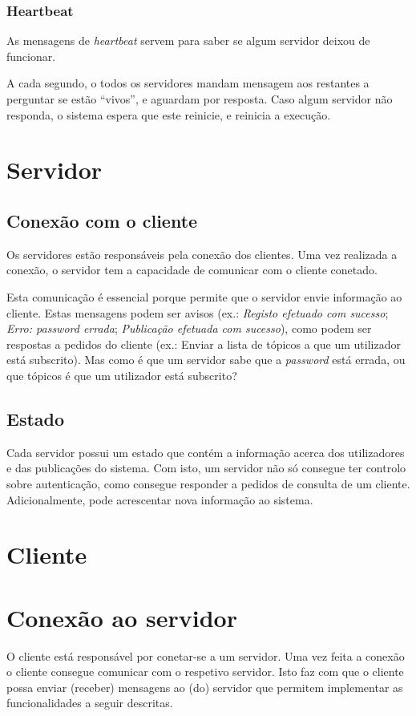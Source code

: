 \documentclass[12pt, a4paper]{report}
\begin{document}
\subsubsection{Heartbeat}
As mensagens de \textit{heartbeat} servem para saber se algum servidor deixou de funcionar.

A cada segundo, o todos os servidores mandam mensagem aos restantes a perguntar se estão ``vivos'', e aguardam por resposta.
Caso algum servidor não responda, o sistema espera que este reinicie, e reinicia a execução.

\section{Servidor}
\subsection{Conexão com o cliente}
Os servidores estão responsáveis pela conexão dos clientes. Uma vez realizada a conexão, o servidor tem a capacidade de comunicar com o cliente conetado.

Esta comunicação é essencial porque permite que o servidor envie informação ao cliente.
Estas mensagens podem ser avisos (ex.: \textit{Registo efetuado com sucesso}; \textit{Erro: password errada}; \textit{Publicação efetuada com sucesso}), como podem ser respostas a pedidos do cliente (ex.: Enviar a lista de tópicos a que um utilizador está subscrito).
Mas como é que um servidor sabe que a \textit{password} está errada, ou que tópicos é que um utilizador está subscrito? 

\subsection{Estado}
Cada servidor possui um estado que contém a informação acerca dos utilizadores e das publicações do sistema.
Com isto, um servidor não só consegue ter controlo sobre autenticação, como consegue responder a pedidos de consulta de um cliente. Adicionalmente, pode acrescentar nova informação ao sistema.

\section{Cliente}
\section{Conexão ao servidor}
O cliente está responsável por conetar-se a um servidor. Uma vez feita a conexão o cliente consegue comunicar com o respetivo servidor.
Isto faz com que o cliente possa enviar (receber) mensagens ao (do) servidor que permitem implementar as funcionalidades a seguir descritas.
\end{document}
